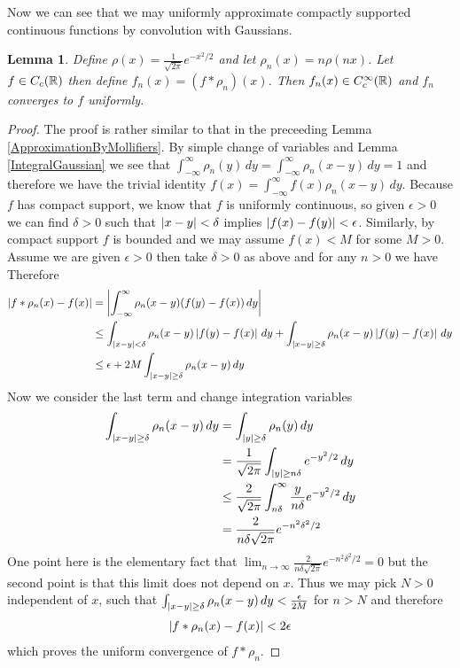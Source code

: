 \documentclass{amsart}
\newtheorem{lem}[thm]{Lemma}
\theoremstyle{remark}
\theoremstyle{definition}
\begin{document}
Now we can see that we may uniformly approximate compactly supported continuous
functions by convolution with Gaussians.
\begin{lem}\label{UniformApproximationByGaussians}Define $\rho(x) =
  \frac{1}{\sqrt{2 \pi} }e^{-x^2/2}$ and let $\rho_n(x) = n\rho(nx)$.
Let $f \in C_c(\mathbb{R})$ then define $f_n(x) = (f *
  \rho_n)(x)$.  Then $f_n(x) \in C_c^\infty(\mathbb{R})$ and $f_n$
  converges to $f$ uniformly.
\end{lem}
\begin{proof}
The proof is rather similar to that in the preceeding Lemma
\ref{ApproximationByMollifiers}.  By simple change of variables and
Lemma \ref{IntegralGaussian} we see
that $\int_{-\infty}^{\infty} \rho_n(y) \, dy =
\int_{-\infty}^{\infty} \rho_n(x - y) \, dy = 1$ and therefore we
have the trivial identity $f(x) = \int_{-\infty}^{\infty} f(x)
\rho_n(x - y) \, dy$.  Because $f$ has compact support, we know that
$f$ is uniformly continuous, so given $\epsilon  > 0$ we can find
$\delta > 0$ such that $\left \vert x -y \right \vert < \delta$ implies $\left \vert f(x) -f(y) \right \vert
< \epsilon$.  Similarly, by compact support $f$ is bounded and we may
assume $f(x) < M$ for some $M > 0$.  Assume we are given
$\epsilon > 0$ then take $\delta>0$ as above and for any $n>0$ we have
Therefore
\begin{align*}
\left \vert f*\rho_n(x) - f(x) \right \vert &= \left \vert \int_{-\infty}^{\infty} \rho_n(x-y)
  (f(y) - f(x)) \, dy \right \vert \\
&\leq \int_{\left \vert x-y \right \vert < \delta} \rho_n(x-y)
  \left \vert   f(y) - f(x)  \right \vert \, dy + \int_{\left \vert x-y \right \vert \geq \delta} \rho_n(x-y)
  \left \vert  f(y) - f(x)  \right \vert \, dy \\
&\leq \epsilon + 2M \int_{\left \vert x-y \right \vert \geq \delta} \rho_n(x-y) \, dy
\end{align*}
Now we consider the last term and change integration variables
\begin{align*}
\int_{\left \vert x-y \right \vert \geq \delta} \rho_n(x-y) \, dy &= \int_{\left \vert y \right \vert \geq
  \delta} \rho_n(y) \, dy \\
&= \frac{1}{\sqrt{2 \pi}} \int_{\left \vert y \right \vert \geq
  n\delta} e^{-y^2/2} \, dy \\
&\leq \frac{2}{\sqrt{2 \pi}} \int_{n\delta}^\infty \frac{y}{n\delta}
e^{-y^2/2} \, dy \\
&= \frac{2}{n \delta \sqrt{2 \pi}} e^{-n^2\delta^2/2}
\end{align*}
One point here is the elementary fact that $\lim_{n \to \infty} \frac{2}{n \delta
  \sqrt{2 \pi}} e^{-n^2\delta^2/2} = 0$ but the second point is that this limit does
not depend on $x$.   Thus we may pick $N > 0$ independent of $x$, such
that $\int_{\left \vert x-y \right \vert \geq \delta} \rho_n(x-y) \, dy  <
\frac{\epsilon}{2M}$ for $n > N$ and therefore
\begin{align*}
\left \vert f*\rho_n(x) - f(x) \right \vert < 2 \epsilon
\end{align*}
which proves the uniform convergence of $f*\rho_n$.
\end{proof}
\end{document}
